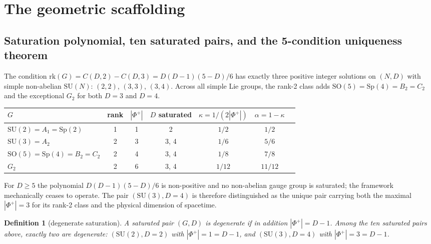 \documentclass[11pt,a4paper]{article}
\newtheorem{definition}[theorem]{Definition}
\newcommand{\SU}{\mathrm{SU}}
\newcommand{\Sp}{\mathrm{Sp}}
\newcommand{\SO}{\mathrm{SO}}
\newcommand{\rk}{\mathrm{rk}}
\newcommand{\Phiplus}{\Phi^{+}}
\begin{document}
\section{The geometric scaffolding}\label{sec:scaffold}

\subsection{Saturation polynomial, ten saturated pairs, and the 5-condition uniqueness theorem}

The condition $\rk(G) = C(D,2) - C(D,3) = D(D-1)(5-D)/6$ has exactly three positive integer solutions on $(N, D)$ with simple non-abelian $\SU(N)$: $(2, 2)$, $(3, 3)$, $(3, 4)$. Across all simple Lie groups, the rank-2 class adds $\SO(5) = \Sp(4) = B_2 = C_2$ and the exceptional $G_2$ for both $D = 3$ and $D = 4$.

\begin{center}
\begin{tabular}{lcccccc}
\toprule
$G$ & rank & $|\Phiplus|$ & $D$ saturated & $\kappa = 1/(2|\Phiplus|)$ & $\alpha = 1 - \kappa$ \\
\midrule
$\SU(2) = A_1 = \Sp(2)$ & 1 & 1 & 2 & $1/2$ & $1/2$ \\
$\SU(3) = A_2$          & 2 & 3 & 3, 4 & $1/6$ & $5/6$ \\
$\SO(5) = \Sp(4) = B_2 = C_2$ & 2 & 4 & 3, 4 & $1/8$ & $7/8$ \\
$G_2$                   & 2 & 6 & 3, 4 & $1/12$ & $11/12$ \\
\bottomrule
\end{tabular}
\end{center}

For $D \geq 5$ the polynomial $D(D-1)(5-D)/6$ is non-positive and no non-abelian gauge group is saturated; the framework mechanically ceases to operate. The pair $(\SU(3), D = 4)$ is therefore distinguished as the unique pair carrying both the maximal $|\Phiplus| = 3$ for its rank-2 class and the physical dimension of spacetime.

\begin{definition}[degenerate saturation]
A saturated pair $(G, D)$ is \emph{degenerate} if in addition $|\Phiplus| = D - 1$. Among the ten saturated pairs above, exactly two are degenerate: $(\SU(2), D = 2)$ with $|\Phiplus| = 1 = D - 1$, and $(\SU(3), D = 4)$ with $|\Phiplus| = 3 = D - 1$.
\end{definition}
\end{document}
